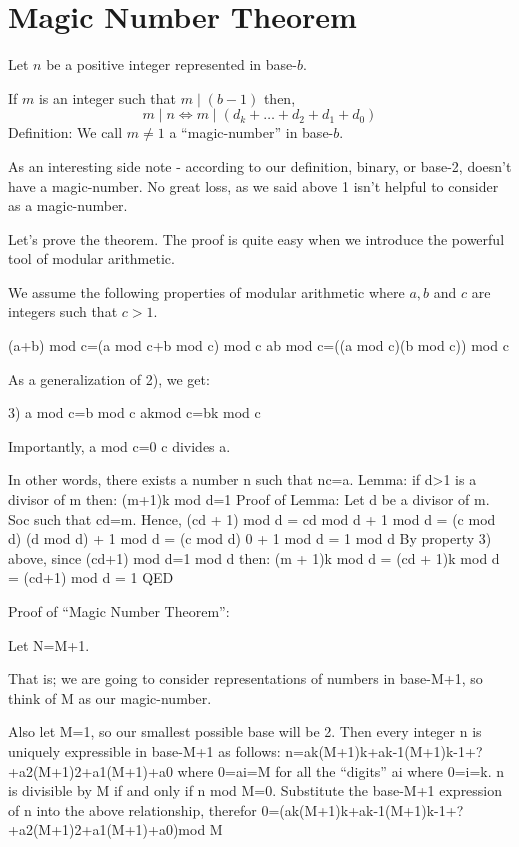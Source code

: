 \documentclass{article}
\newenvironment{jprIn}{\begin{adjustwidth}{2em}{}}{\end{adjustwidth}}
\begin{document}
\section*{Magic Number Theorem}
\begin{jprIn}
Let $n$ be a positive integer represented in base-$b$.

If $m$ is an integer such that $m\mid{}(b-1)$ then,
\[m\mid{}n \Leftrightarrow m\mid{}(d_k+\dots+d_2+d_1+d_0)\]
Definition: We call $m\ne1$ a ``magic-number'' in base-$b$.
\end{jprIn}
\bigskip

As an interesting side note - according to our definition, binary,
or base-2, doesn't have a magic-number.
No great loss, as we said above 1 isn't helpful to consider as a magic-number. 

Let's prove the theorem. The proof is quite easy when we introduce 
the powerful tool of modular arithmetic.

We assume the following properties of modular arithmetic where $a,b$ and $c$ are
integers such that $c>1$.

(a+b) mod c=(a mod c+b mod c) mod c
ab mod c=((a mod c)(b mod c)) mod c

As a generalization of 2), we get:

3) a mod c=b mod c akmod c=bk mod c

Importantly, a mod c=0 c divides a.

In other words, there exists a number n such that nc=a.
Lemma:
if d>1 is a divisor of m then:
(m+1)k mod d=1
Proof of Lemma:
Let d be a divisor of m. Soc such that cd=m.
Hence, (cd + 1) mod d = cd mod d + 1 mod d
= (c mod d) (d mod d) + 1 mod d
= (c mod d) 0 + 1 mod d
= 1 mod d
By property 3) above, since (cd+1) mod d=1 mod d then:
(m + 1)k mod d
= (cd + 1)k mod d
= (cd+1) mod d
= 1
QED

Proof of ``Magic Number Theorem'':

Let N=M+1.

That is; we are going to consider representations of numbers in base-M+1, so think of M as our magic-number.

Also let M=1, so our smallest possible base will be 2.
Then every integer n is uniquely expressible in base-M+1 as follows:
n=ak(M+1)k+ak-1(M+1)k-1+?+a2(M+1)2+a1(M+1)+a0
where 0=ai=M for all the ``digits'' ai where 0=i=k.
n is divisible by M if and only if n mod M=0. 
Substitute the base-M+1 expression of n into the above relationship, therefor
0=(ak(M+1)k+ak-1(M+1)k-1+?+a2(M+1)2+a1(M+1)+a0)mod M


\end{document}
